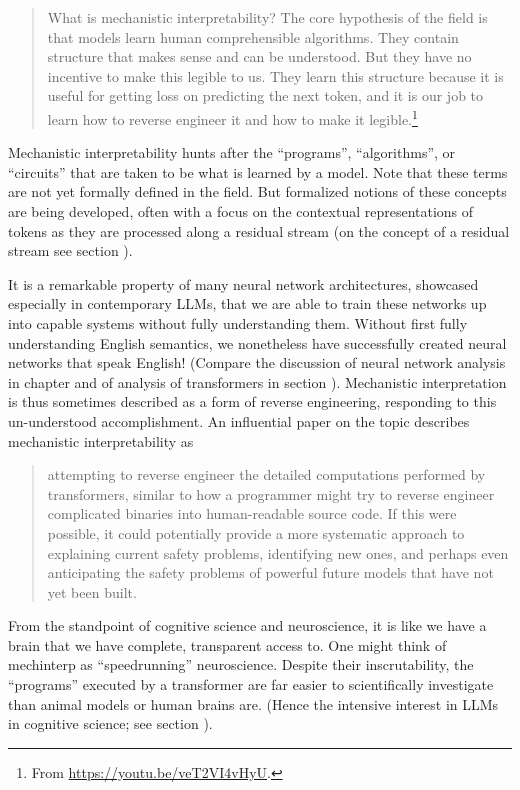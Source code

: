 \begin{quote}
What is mechanistic interpretability? The core hypothesis of the field is that
models learn human comprehensible algorithms. They contain structure that makes
sense and can be understood. But they have no incentive to make this legible to
us. They learn this structure because it is useful for getting loss on
predicting the next token, and it is our job to learn how to reverse engineer
it and how to make it legible.\footnote{From
\url{https://youtu.be/veT2VI4vHyU}.}
\end{quote}
Mechanistic interpretability hunts after the ``programs'', ``algorithms'', or ``circuits''
that are taken to be what is learned by a model. Note that these terms are not yet formally
defined in the field. But formalized notions of these concepts are being
developed, often with a focus on the contextual representations of tokens as they are processed
along a residual stream (on the concept of a residual stream see section
).

It is a remarkable property of many neural network architectures, showcased
especially in contemporary LLMs, that we are able to train these networks up
into capable systems without fully understanding them. Without first fully
understanding English semantics, we nonetheless have successfully created
neural networks that speak English! (Compare the discussion of neural network
analysis in chapter  and of analysis of transformers in
section ). Mechanistic interpretation is thus sometimes
described as a form of reverse engineering, responding to this un-understood
accomplishment. An influential paper on the topic describes mechanistic
interpretability as

\begin{quote}
attempting to reverse engineer the detailed computations performed by
transformers, similar to how a programmer might try to reverse engineer
complicated binaries into human-readable source code.  If this were possible,
it could potentially provide a more systematic approach to explaining current
safety problems, identifying new ones, and perhaps even anticipating the safety
problems of powerful future models that have not yet been
built.\cite{elhage2021mathematical} 
\end{quote}

From the standpoint of cognitive science and neuroscience, it is like we have a
brain that we have complete, transparent access to. One might think of
mechinterp as ``speedrunning'' neuroscience. Despite their
inscrutability, the ``programs'' executed by a transformer are far easier to
scientifically investigate than animal models or human brains are. (Hence the
intensive interest in LLMs in cognitive science; see section
).

